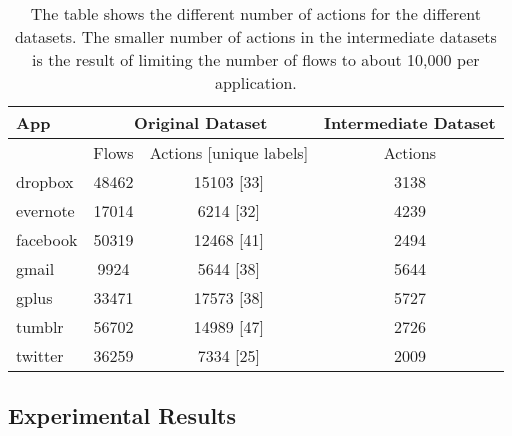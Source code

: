 \begin{table}[!h]
\centering
\begin{tabular}{|l|c|c|c|}
\hline
App      & \multicolumn{2}{c|}{Original Dataset} & Intermediate Dataset \\ \hline
         & Flows    & Actions [unique labels]    & Actions              \\ \hline
dropbox  & 48462    & 15103 [33]                 & 3138                 \\ \hline
evernote & 17014    & 6214 [32]                  & 4239                 \\ \hline
facebook & 50319    & 12468 [41]                 & 2494                 \\ \hline
gmail    & 9924     & 5644 [38]                  & 5644                 \\ \hline
gplus    & 33471    & 17573 [38]                 & 5727                 \\ \hline
tumblr   & 56702    & 14989 [47]                 & 2726                 \\ \hline
twitter  & 36259    & 7334 [25]                  & 2009                 \\ \hline
\end{tabular}
\caption{\small{The table shows the different number of actions for the different datasets. The smaller number of actions in the intermediate datasets is the result of limiting the number of flows to about 10,000 per application.}}
\label{tab:datasetdata}
\end{table}

\subsection{Experimental Results}






